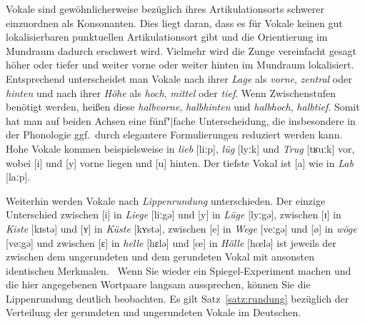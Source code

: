 Vokale sind gewöhnlicherweise bezüglich ihres Artikulationsorts schwerer einzuordnen als Konsonanten.
Dies liegt daran, dass es für Vokale keinen gut lokalisierbaren punktuellen Artikulationsort gibt und die Orientierung im Mundraum dadurch erschwert wird.
Vielmehr wird die Zunge vereinfacht gesagt höher oder tiefer und weiter vorne oder weiter hinten im Mundraum lokalisiert.
Entsprechend unterscheidet man Vokale nach ihrer \textit{Lage} als \textit{vorne}, \textit{zentral} oder \textit{hinten} und nach ihrer \textit{Höhe} als \textit{hoch}, \textit{mittel} oder \textit{tief}.
Wenn Zwischenstufen benötigt werden, heißen diese \textit{halbvorne}, \textit{halbhinten} und \textit{halbhoch}, \textit{halbtief}.
Somit hat man auf beiden Achsen eine fünf"|fache Unterscheidung, die insbesondere in der Phonologie ggf.\ durch elegantere Formulierungen reduziert werden kann.
Hohe Vokale kommen beispielsweise in \textit{lieb} [liːp], \textit{lüg} [lyːk] und \textit{Trug} [tʁuːk] vor, wobei [i] und [y] vorne liegen und [u] hinten.
Der tiefste Vokal ist [a] wie in \textit{Lab} [laːp].

Weiterhin werden Vokale nach \textit{Lippenrundung} unterschieden.
Der einzige Unterschied
zwischen [i] in \textit{Liege} [liːgə] und [y] in \textit{Lüge} [lyːgə],
zwischen [ɪ] in \textit{Kiste} [kɪstə] und [ʏ] in \textit{Küste} [kʏstə],
zwischen [e] in \textit{Wege} [veːgə] und [ø] in \textit{wöge} [vøːgə]
und zwischen [ɛ] in \textit{helle} [hɛlə] und [œ] in \textit{Hölle} [hœlə]
ist jeweils der zwischen dem ungerundeten und dem gerundeten Vokal mit ansonsten identischen Merkmalen.
\TuBegin~Wenn Sie wieder ein Spiegel-Experiment machen und die hier angegebenen Wortpaare langsam aussprechen, können Sie die Lippenrundung deutlich beobachten.
Es gilt Satz~\ref{satz:rundung} bezüglich der Verteilung der gerundeten und ungerundeten Vokale im Deutschen.


